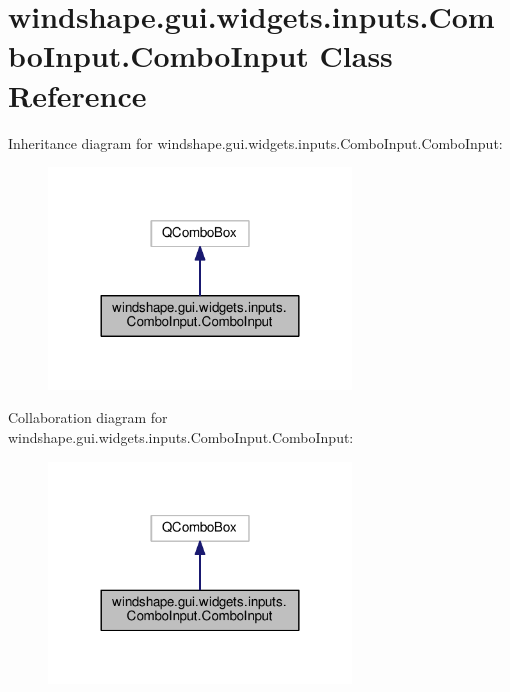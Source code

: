 \hypertarget{classwindshape_1_1gui_1_1widgets_1_1inputs_1_1_combo_input_1_1_combo_input}{}\section{windshape.\+gui.\+widgets.\+inputs.\+Combo\+Input.\+Combo\+Input Class Reference}
\label{classwindshape_1_1gui_1_1widgets_1_1inputs_1_1_combo_input_1_1_combo_input}


Inheritance diagram for windshape.\+gui.\+widgets.\+inputs.\+Combo\+Input.\+Combo\+Input\+:\nopagebreak
\begin{figure}[H]
\begin{center}
\leavevmode
\includegraphics[width=228pt]{classwindshape_1_1gui_1_1widgets_1_1inputs_1_1_combo_input_1_1_combo_input__inherit__graph}
\end{center}
\end{figure}


Collaboration diagram for windshape.\+gui.\+widgets.\+inputs.\+Combo\+Input.\+Combo\+Input\+:\nopagebreak
\begin{figure}[H]
\begin{center}
\leavevmode
\includegraphics[width=228pt]{classwindshape_1_1gui_1_1widgets_1_1inputs_1_1_combo_input_1_1_combo_input__coll__graph}
\end{center}
\end{figure}
